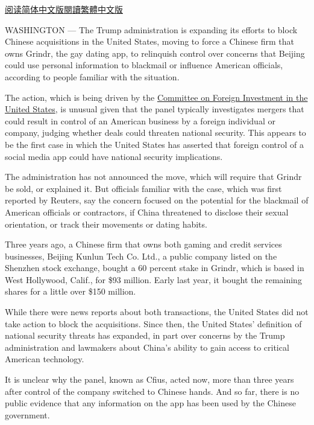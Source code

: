 \href{https://cn.nytimes.com/usa/20190329/grindr-china-national-security/}{阅读简体中文版}\href{https://cn.nytimes.com/usa/20190329/grindr-china-national-security/zh-hant/}{閱讀繁體中文版}

WASHINGTON --- The Trump administration is expanding its efforts to
block Chinese acquisitions in the United States, moving to force a
Chinese firm that owns Grindr, the gay dating app, to relinquish control
over concerns that Beijing could use personal information to blackmail
or influence American officials, according to people familiar with the
situation.

The action, which is being driven by the
\href{https://www.nytimes.com/2018/03/05/business/what-is-cfius.html}{Committee
on Foreign Investment in the United States}, is unusual given that the
panel typically investigates mergers that could result in control of an
American business by a foreign individual or company, judging whether
deals could threaten national security. This appears to be the first
case in which the United States has asserted that foreign control of a
social media app could have national security implications.

The administration has not announced the move, which will require that
Grindr be sold, or explained it. But officials familiar with the case,
which was first reported by Reuters, say the concern focused on the
potential for the blackmail of American officials or contractors, if
China threatened to disclose their sexual orientation, or track their
movements or dating habits.

Three years ago, a Chinese firm that owns both gaming and credit
services businesses, Beijing Kunlun Tech Co. Ltd., a public company
listed on the Shenzhen stock exchange, bought a 60 percent stake in
Grindr, which is based in West Hollywood, Calif., for \$93 million.
Early last year, it bought the remaining shares for a little over \$150
million.

While there were news reports about both transactions, the United States
did not take action to block the acquisitions. Since then, the United
States' definition of national security threats has expanded, in part
over concerns by the Trump administration and lawmakers about China's
ability to gain access to critical American technology.

It is unclear why the panel, known as Cfius, acted now, more than three
years after control of the company switched to Chinese hands. And so
far, there is no public evidence that any information on the app has
been used by the Chinese government.

